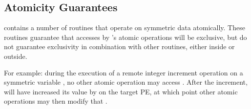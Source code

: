 \subsection{Atomicity Guarantees}

\openshmem contains a number of routines that operate on symmetric data
atomically.  These routines guarantee that accesses by \openshmem's
atomic operations will be exclusive, but do not guarantee exclusivity
in combination with other routines, either inside \openshmem or
outside.

For example: during the execution of a remote integer increment
operation on a symmetric variable , no other \openshmem atomic
operation may access .  After the increment,  will have
increased its value by  on the target \ac{PE}, at which point other
atomic operations may then modify that .

